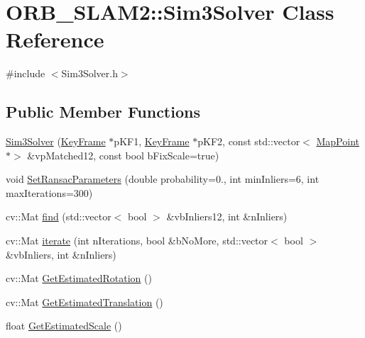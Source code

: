 \hypertarget{class_o_r_b___s_l_a_m2_1_1_sim3_solver}{}\section{O\+R\+B\+\_\+\+S\+L\+A\+M2\+:\+:Sim3\+Solver Class Reference}
\label{class_o_r_b___s_l_a_m2_1_1_sim3_solver}


{\ttfamily \#include $<$Sim3\+Solver.\+h$>$}

\subsection*{Public Member Functions}
\begin{DoxyCompactItemize}
\item 
\mbox{\hyperlink{class_o_r_b___s_l_a_m2_1_1_sim3_solver_ac4825895bc1a5a74fc71cd4fbfd4f2a6}{Sim3\+Solver}} (\mbox{\hyperlink{class_o_r_b___s_l_a_m2_1_1_key_frame}{Key\+Frame}} $\ast$p\+K\+F1, \mbox{\hyperlink{class_o_r_b___s_l_a_m2_1_1_key_frame}{Key\+Frame}} $\ast$p\+K\+F2, const std\+::vector$<$ \mbox{\hyperlink{class_o_r_b___s_l_a_m2_1_1_map_point}{Map\+Point}} $\ast$$>$ \&vp\+Matched12, const bool b\+Fix\+Scale=true)
\item 
void \mbox{\hyperlink{class_o_r_b___s_l_a_m2_1_1_sim3_solver_ab90d591f1b9eac3d846efd35c2c04920}{Set\+Ransac\+Parameters}} (double probability=0., int min\+Inliers=6, int max\+Iterations=300)
\item 
cv\+::\+Mat \mbox{\hyperlink{class_o_r_b___s_l_a_m2_1_1_sim3_solver_a34ba62d5d8033ab12a811c241f30544b}{find}} (std\+::vector$<$ bool $>$ \&vb\+Inliers12, int \&n\+Inliers)
\item 
cv\+::\+Mat \mbox{\hyperlink{class_o_r_b___s_l_a_m2_1_1_sim3_solver_ae07cddad85e41611bd454f8026de31a6}{iterate}} (int n\+Iterations, bool \&b\+No\+More, std\+::vector$<$ bool $>$ \&vb\+Inliers, int \&n\+Inliers)
\item 
cv\+::\+Mat \mbox{\hyperlink{class_o_r_b___s_l_a_m2_1_1_sim3_solver_a9cf5646f2530a074e30320ae5cf1cb4b}{Get\+Estimated\+Rotation}} ()
\item 
cv\+::\+Mat \mbox{\hyperlink{class_o_r_b___s_l_a_m2_1_1_sim3_solver_a27f28d7708a7215279751e592a17d0d5}{Get\+Estimated\+Translation}} ()
\item 
float \mbox{\hyperlink{class_o_r_b___s_l_a_m2_1_1_sim3_solver_a3942b204d02957269bad6a00c03a1e4b}{Get\+Estimated\+Scale}} ()
\end{DoxyCompactItemize}
